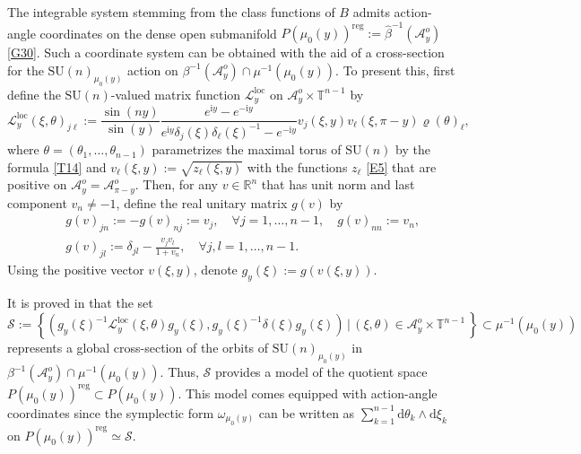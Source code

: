 \documentclass[a4paper,11pt,reqno]{amsart}
\theoremstyle{definition}
\numberwithin{equation}{section}
\newcommand{\be}{\begin{equation}}
\newcommand{\ee}{\end{equation}}
\newcommand{\bea}{\begin{eqnarray}}
\newcommand{\eea}{\end{eqnarray}}
\def\cA{{\mathcal A}}                       %
\def\bT{{\mathbb T}}                        %
\def\loc{\mathrm{loc}}                      %
\def\reg{\mathrm{reg}}                      %
\def\ri{{\mathrm{i}}}                       %
\def\bR{{\mathbb R}}                        %
\def\SU{\mathrm{SU}}                        %
\def\reg{\mathrm{reg}}                      %
\def\cL{{\mathcal L}}                       %
\def\cS{{\mathcal S}}                       %
\begin{document}
The integrable system stemming from the class functions of $B$ admits action-angle
coordinates on the dense open submanifold  $P(\mu_0(y))^\reg:= \hat \beta^{-1}(\cA_y^o)$ \eqref{G30}.
Such a coordinate system can be obtained \cite{FKlim,FK} with the aid of a
cross-section for the $\SU(n)_{\mu_0(y)}$ action on $\beta^{-1}(\cA_y^o) \cap \mu^{-1}(\mu_0(y))$.
To present this, first
define the $\SU(n)$-valued matrix function $\cL_y^\loc$ on $\cA_{y}^o \times \bT^{n-1}$
by
\be
\cL_y^\loc(\xi,\theta)_{j \ell} :=
\frac{\sin (ny)}{\sin (y)}
\frac{e^{\ri y} - e^{-\ri y}}{e^{\ri y} \delta_j(\xi) \delta_\ell(\xi)^{-1} - e^{-\ri y}}
v_j(\xi,y) v_\ell(\xi,\pi-y) \varrho(\theta)_\ell,
\label{A1}\ee
where $\theta = (\theta_1,\dots, \theta_{n-1})$ parametrizes the maximal torus of $\SU(n)$ by the formula \eqref{T14}
and $v_\ell(\xi,y) := \sqrt{z_\ell(\xi, y)}$ with
the functions $z_\ell$  \eqref{E5} that are positive on $\cA_y^o = \cA_{\pi-y}^o$.
Then,
for any $v\in \bR^n$ that has unit norm and last component $v_n\neq -1$,
define the real unitary matrix $g(v)$  by
\bea
&&g(v)_{jn} := - g(v)_{nj}:= v_j,
\quad
\forall j=1,\ldots, n-1,
\quad
g(v)_{nn} := v_n,\nonumber\\
&& g(v)_{jl} := \delta_{jl}- \frac{v_j v_l}{ 1 + v_n},
\quad
\forall j,l=1,\ldots, n-1.
\label{A2}\eea
Using the positive vector $v(\xi,y)$,  denote $g_y(\xi):= g(v(\xi,y))$.

It is proved in \cite{FKlim,FK} that the set
\be
\cS:= \left\{\left( g_y(\xi)^{-1} \cL_y^\loc(\xi,\theta) g_y(\xi), g_y(\xi)^{-1}
\delta(\xi)g_y(\xi) \right)\,\Big\vert \,
(\xi,\theta)\in \cA^o_{y} \times \bT^{n-1}\,\right\}
\subset \mu^{-1}(\mu_0(y))
\label{A3}\ee
represents a  global cross-section of the orbits of $\SU(n)_{\mu_0(y)}$
in $\beta^{-1}(\cA^o_{y}) \cap \mu^{-1}(\mu_0(y))$.
Thus, $\cS$ provides a model of the quotient space $P(\mu_0(y))^\reg\subset P(\mu_0(y))$.
This model comes equipped with action-angle coordinates since the symplectic form  $\omega_{\mu_0(y)}$ can be written as
$ \sum_{k=1}^{n-1} \mathrm{d} \theta_k \wedge \mathrm{d} \xi_k$ on $P(\mu_0(y))^\reg \simeq \cS$.
\end{document}
